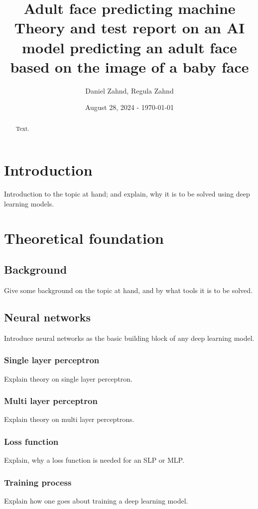 \documentclass[a4paper,10pt, twocolumn]{article}
\author{Daniel Zahnd, Regula Zahnd}
\date{August 28, 2024 - \today}
\title{Adult face predicting machine \\ \vspace{0.5cm} \normalsize Theory and test report on an AI model predicting an adult face based on the image of a baby face}
\begin{document}
\maketitle


\begin{abstract}
Text.
\end{abstract}

\section{Introduction}
Introduction to the topic at hand; and explain, why it is to be solved using deep learning models.

\section{Theoretical foundation}
\subsection{Background}
Give some background on the topic at hand, and by what tools it is to be solved.

\subsection{Neural networks}
Introduce neural networks as the basic building block of any deep learning model.

\subsubsection{Single layer perceptron}
Explain theory on single layer perceptron.

\subsubsection{Multi layer perceptron}
Explain theory on multi layer perceptrons.

\subsubsection{Loss function}
Explain, why a loss function is needed for an SLP or MLP.

\subsubsection{Training process}
Explain how one goes about training a deep learning model.
\end{document}
